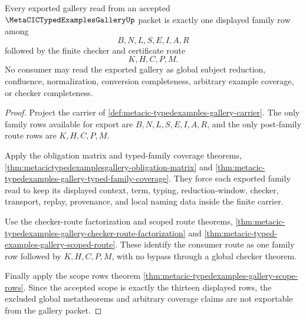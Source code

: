 \begin{theorem}
\label{thm:metacic-typed-examples-gallery-scope-export}
Every exported gallery read from an accepted $\MetaCICTypedExamplesGalleryUp$ packet is exactly one displayed family row among
$$
B,N,L,S,E,I,A,R
$$
followed by the finite checker and certificate route
$$
K,H,C,P,M.
$$
No consumer may read the exported gallery as global subject reduction, confluence, normalization, conversion completeness, arbitrary example coverage, or checker completeness.
\end{theorem}
\begin{proof}
Project the carrier of \autoref{def:metacic-typedexamples-gallery-carrier}. The only family rows available for export are $B,N,L,S,E,I,A,R$, and the only post-family route rows are $K,H,C,P,M$.

Apply the obligation matrix and typed-family coverage theorems, \autoref{thm:metacictypedexamplesgallery-obligation-matrix} and \autoref{thm:metacic-typedexamples-gallery-typed-family-coverage}. They force each exported family read to keep its displayed context, term, typing, reduction-window, checker, transport, replay, provenance, and local naming data inside the finite carrier.

Use the checker-route factorization and scoped route theorems, \autoref{thm:metacic-typedexamples-gallery-checker-route-factorization} and \autoref{thm:metacic-typed-examples-gallery-scoped-route}. These identify the consumer route as one family row followed by $K,H,C,P,M$, with no bypass through a global checker theorem.

Finally apply the scope rows theorem \autoref{thm:metacic-typedexamples-gallery-scope-rows}. Since the accepted scope is exactly the thirteen displayed rows, the excluded global metatheorems and arbitrary coverage claims are not exportable from the gallery packet.
\end{proof}

